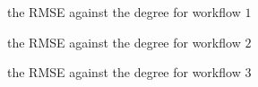 \documentclass{article}
\begin{document}
\begin{figure}[!htbp]
\centering
{}
\caption{the RMSE against the degree for workflow $1$} \label{1d2_10}
\end{figure}

\begin{figure}[!htbp]
\centering
{}
\caption{the RMSE against the degree for workflow $2$} \label{1d2_20}
\end{figure}

\begin{figure}[!htbp]
\centering
{}
\caption{the RMSE against the degree for workflow $3$} \label{1d2_30}
\end{figure}
\end{document}
